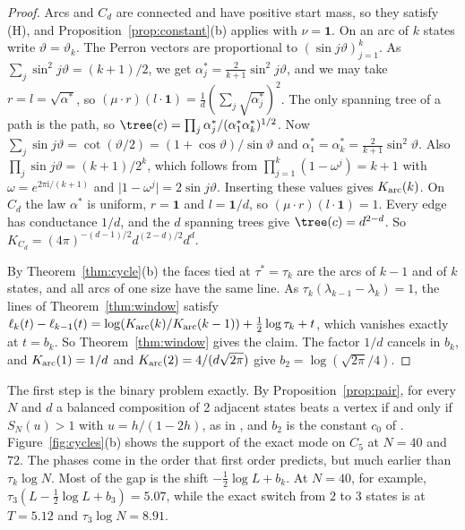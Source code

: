 \begin{proof}
Arcs and $C_d$ are connected and have positive start mass, so they satisfy (H),
and Proposition~\ref{prop:constant}(b) applies with $\nu=\mathbf 1$. On an arc of
$k$ states write $\vartheta=\vartheta_k$. The Perron vectors are proportional to
$(\sin j\vartheta)_{j=1}^k$. As $\sum_j\sin^2j\vartheta=(k+1)/2$, we get
$\alpha^*_j=\frac2{k+1}\sin^2j\vartheta$, and we may take
$r=l=\sqrt{\alpha^*}$, so $(\mu\cdot r)(l\cdot\mathbf
1)=\frac1d(\sum_j\sqrt{\alpha^*_j})^2$. The only spanning tree of a path is the
path, so $\tree(c)=\prod_j\alpha^*_j/(\alpha^*_1\alpha^*_k)^{1/2}$. Now
$\sum_j\sin j\vartheta=\cot(\vartheta/2)=(1+\cos\vartheta)/\sin\vartheta$ and
$\alpha^*_1=\alpha^*_k=\frac2{k+1}\sin^2\vartheta$. Also
$\prod_j\sin j\vartheta=(k+1)/2^k$, which follows from
$\prod_{j=1}^k(1-\omega^j)=k+1$ with $\omega=e^{2\pi\mathrm i/(k+1)}$ and
$\lvert1-\omega^j\rvert=2\sin j\vartheta$. Inserting these values gives
$K_{\rm arc}(k)$. On $C_d$ the law $\alpha^*$ is uniform, $r=\mathbf 1$ and
$l=\mathbf 1/d$, so $(\mu\cdot r)(l\cdot\mathbf 1)=1$. Every edge has
conductance $1/d$, and the $d$ spanning trees give $\tree(c)=d^{2-d}$. So
$K_{C_d}=(4\pi)^{-(d-1)/2}d^{(2-d)/2}d^{d}$.

By Theorem~\ref{thm:cycle}(b) the faces tied at $\tau^*=\tau_k$ are the arcs of
$k-1$ and of $k$ states, and all arcs of one size have the same line. As
$\tau_k(\lambda_{k-1}-\lambda_k)=1$, the lines of Theorem~\ref{thm:window}
satisfy
$\ell_k(t)-\ell_{k-1}(t)=\log(K_{\rm arc}(k)/K_{\rm arc}(k-1))+\frac12\log\tau_k+t$,
which vanishes exactly at $t=b_k$. So Theorem~\ref{thm:window} gives the claim.
The factor $1/d$ cancels in $b_k$, and $K_{\rm arc}(1)=1/d$ and $K_{\rm
arc}(2)=4/(d\sqrt{2\pi})$ give $b_2=\log(\sqrt{2\pi}/4)$.
\end{proof}

The first step is the binary problem exactly. By Proposition~\ref{prop:pair},
for every $N$ and $d$ a balanced composition of 2 adjacent states beats a
vertex if and only if $S_N(u)>1$ with $u=h/(1-2h)$, as in
\cite[Thm.~5.1]{paperA}, and $b_2$ is the constant $c_0$ of \cite{paperA}.
Figure~\ref{fig:cycles}(b) shows the support of the exact mode on $C_5$ at
$N=40$ and $72$. The phases come in the order that first order predicts, but
much earlier than $\tau_k\log N$. Most of the gap is the shift $-\frac12\log L+b_k$. At
$N=40$, for example, $\tau_3(L-\frac12\log L+b_3)=5.07$, while the exact switch
from $2$ to $3$ states is at $T=5.12$ and $\tau_3\log N=8.91$.

